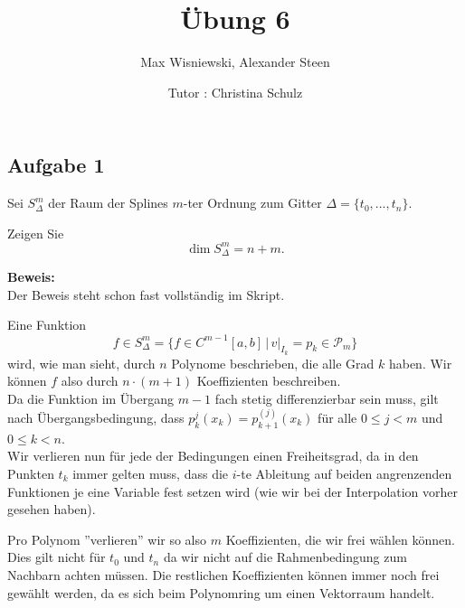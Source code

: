 \documentclass[11pt,a4paper,ngerman]{article}
\date{Tutor : Christina Schulz}
\title{Übung 6}
\author{Max Wisniewski, Alexander Steen}
\begin{document}

\renewcommand{\figurename}{Figure}

\maketitle
\thispagestyle{fancy}

\subsection*{Aufgabe 1}

Sei $S_\Delta^m$ der Raum der Splines $m$-ter Ordnung zum Gitter $\Delta = \{ t_0 , ..., t_n \}$.

Zeigen Sie
\begin{equation*}
    \dim S_\Delta^m = n + m.
\end{equation*}

\textbf{Beweis:}\\

Der Beweis steht schon fast vollständig im Skript.

Eine Funktion
\begin{equation*}
    f \in S_\Delta^m = \{ f \in C^{m-1}[a,b] \, | \, v|_{I_k} = p_k \in \mathcal{P}_m\}
\end{equation*}
wird, wie man sieht, durch $n$ Polynome beschrieben, die alle Grad $k$ haben.
Wir können $f$ also durch $n \cdot (m+1)$ Koeffizienten beschreiben.\\

Da die Funktion im Übergang $m-1$ fach stetig differenzierbar sein muss, gilt nach Übergangsbedingung,
dass $p_k^j(x_k) = p_{k+1}^(j)(x_k)$ für alle $0 \leq j < m$ und $0 \leq k < n$.\\

Wir verlieren nun für jede der Bedingungen einen Freiheitsgrad, da in den Punkten $t_k$ immer
gelten muss, dass die $i$-te Ableitung auf beiden angrenzenden Funktionen je eine Variable fest setzen
wird (wie wir bei der Interpolation vorher gesehen haben).

Pro Polynom ''verlieren'' wir so also $m$ Koeffizienten, die wir frei wählen können. Dies gilt nicht für
$t_0$ und $t_n$ da wir nicht auf die Rahmenbedingung zum Nachbarn achten müssen. Die restlichen
Koeffizienten können immer noch frei gewählt werden, da es sich beim Polynomring um einen Vektorraum handelt.
\end{document}
